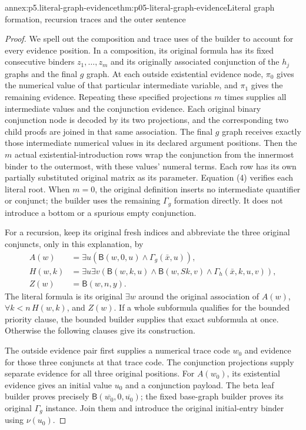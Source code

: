 \begin{annexitem}{annex:p5.literal-graph-evidence}{thm:p05-literal-graph-evidence}{Literal graph formation, recursion traces and the outer sentence}
\begin{proof}
We spell out the composition and trace uses of the builder to account
for every evidence position. In a composition, its original formula
has its fixed consecutive binders \(z_1,\ldots,z_m\) and its
originally associated conjunction of the \(h_j\) graphs and the
final \(g\) graph. At each outside existential evidence node,
\(\pi_0\) gives the numerical value of that particular intermediate
variable, and \(\pi_1\) gives the remaining evidence. Repeating
these specified projections \(m\) times supplies all intermediate
values and the conjunction evidence. Each original binary
conjunction node is decoded by its two projections, and the
corresponding two child proofs are joined in that same association.
The final \(g\) graph receives exactly those intermediate numerical
values in its declared argument positions. Then the \(m\) actual
existential-introduction rows wrap the conjunction from the innermost
binder to the outermost, with these values' numeral terms. Each row
has its own partially substituted original matrix as its parameter.
Equation (4) verifies each literal root. When \(m=0\), the original
definition inserts no intermediate quantifier or conjunct; the
builder uses the remaining \(\Gamma_g\) formation directly. It
does not introduce a bottom or a spurious empty conjunction.

For a recursion, keep its original fresh indices and abbreviate the
three original conjuncts, only in this explanation, by
\[
\begin{aligned}
 A(w)&=\exists u(\mathsf B(w,0,u)\land\Gamma_g(\bar x,u)),\\
 H(w,k)&=\exists u\exists v
   (\mathsf B(w,k,u)\land\mathsf B(w,Sk,v)
                            \land\Gamma_h(\bar x,k,u,v)),\\
 Z(w)&=\mathsf B(w,n,y).
\end{aligned}
\tag{11}
\]
The literal formula is its original \(\exists w\) around the
original association of \(A(w)\), \(\forall k<n\,H(w,k)\),
and \(Z(w)\). If a whole subformula qualifies for the bounded
priority clause, the bounded builder supplies that exact subformula
at once. Otherwise the following clauses give its construction.

The outside evidence pair first supplies a numerical trace code
\(w_0\) and evidence for those three conjuncts at that trace code.
The conjunction projections supply separate evidence for all three
original positions. For \(A(w_0)\), its existential evidence gives
an initial value \(u_0\) and a conjunction payload. The beta leaf
builder proves precisely \(\mathsf B(\overline{w_0},0,
\overline{u_0})\); the fixed base-graph builder proves its original
\(\Gamma_g\) instance. Join them and introduce the original
initial-entry binder using \(\nu(u_0)\).


\end{proof}
\end{annexitem}
